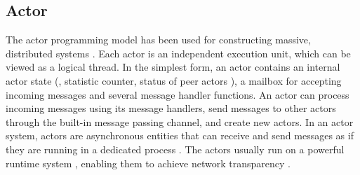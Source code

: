 





\subsection{Actor} 

The actor programming model has been used for constructing massive, distributed systems \cite{actor-wiki, akka, newell2016optimizing, AnalysisActor}. Each actor is an independent execution unit, which can be viewed as a logical thread. In the simplest form, an actor contains an internal actor state (\eg, statistic counter, status of peer actors ), a mailbox for accepting incoming messages and several message handler functions. An actor can process incoming messages using its message handlers, send messages to other actors through the built-in message passing channel, and create new actors.  In an actor system, actors are asynchronous entities that can receive and send messages as if they are running in a dedicated process . The actors usually run on a powerful runtime system \cite{erlang, akka, caf} , enabling them to achieve network transparency . 

